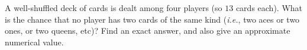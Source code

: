 \documentclass[12pt]{article}
\begin{document}
\begin{problem}
    A well-shuffled deck of cards is dealt among four players
    (so $13$ cards each).
    What is the chance that no player has two cards of the same kind
    (\textit{i.e.}, two aces or two ones, or two queens, etc)?
    Find an exact answer, and also give an approximate numerical value.
\end{problem}
\end{document}
